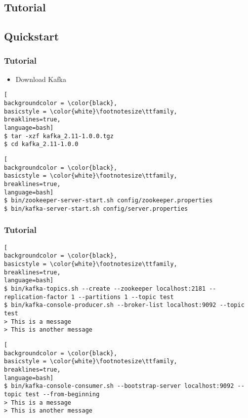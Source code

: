\begin{frame}[fragile]
\section{Tutorial}
\subsection{Quickstart}
\frametitle{Tutorial}
\begin{itemize}

\item Download Kafka~\cite{KafkaDownload}
\end{itemize}
\begin{lstlisting}[
backgroundcolor = \color{black},
basicstyle = \color{white}\footnotesize\ttfamily,
breaklines=true,
language=bash]
$ tar -xzf kafka_2.11-1.0.0.tgz
$ cd kafka_2.11-1.0.0
\end{lstlisting}

\begin{lstlisting}[
backgroundcolor = \color{black},
basicstyle = \color{white}\footnotesize\ttfamily,
breaklines=true,
language=bash]
$ bin/zookeeper-server-start.sh config/zookeeper.properties
$ bin/kafka-server-start.sh config/server.properties
\end{lstlisting}
\end{frame}

\begin{frame}[fragile]
\frametitle{Tutorial}
\begin{lstlisting}[
backgroundcolor = \color{black},
basicstyle = \color{white}\footnotesize\ttfamily,
breaklines=true,
language=bash]
$ bin/kafka-topics.sh --create --zookeeper localhost:2181 --replication-factor 1 --partitions 1 --topic test
$ bin/kafka-console-producer.sh --broker-list localhost:9092 --topic test
> This is a message
> This is another message
\end{lstlisting}

\begin{lstlisting}[
backgroundcolor = \color{black},
basicstyle = \color{white}\footnotesize\ttfamily,
breaklines=true,
language=bash]
$ bin/kafka-console-consumer.sh --bootstrap-server localhost:9092 --topic test --from-beginning
> This is a message
> This is another message
\end{lstlisting}
\end{frame}

